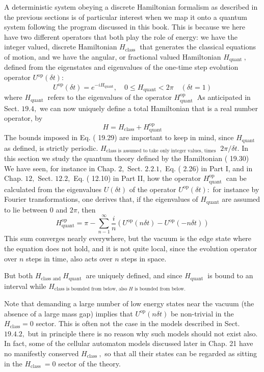 \documentclass[main.tex]{subfiles}
\begin{document}
A deterministic system obeying a discrete Hamiltonian formalism as described in the previous sections is of particular interest when we map it onto a quantum system following the program discussed in this book. This is because we here have two different operators that both play the role of energy: we have the integer valued, discrete Hamiltonian $H_{\text {class }}$ that generates the classical equations of motion, and we have the angular, or fractional valued Hamiltonian $H_{\text {quant }},$ defined from the eigenstates and eigenvalues of the one-time step evolution operator $U^{\mathrm{op}}(\delta t):$
$$
U^{\mathrm{op}}(\delta t)=e^{-i H_{\mathrm{quant}}}, \quad 0 \leq H_{\mathrm{quant}}<2 \pi \quad(\delta t=1)
$$
where $H_{\text {quant }}$ refers to the eigenvalues of the operator $H_{\text {quant }}^{\text {op }}$ As anticipated in Sect. $19.4,$ we can now uniquely define a total Hamiltonian that is a real number operator, by
$$
H=H_{\mathrm{class}}+H_{\mathrm{quant}}^{\mathrm{op}}
$$
The bounds imposed in Eq. ( 19.29) are important to keep in mind, since $H_{\mathrm{quant}}$ as defined, is strictly periodic. $H_{\text {class is assumed to take only integer values, times }}$ $2 \pi / \delta t .$ In this section we study the quantum theory defined by the Hamiltonian ( 19.30)
We have seen, for instance in Chap. $2,$ Sect. $2.2 .1,$ Eq. ( 2.26) in Part I, and in Chap. $12,$ Sect. $12.2,$ Eq. ( 12.10) in Part II, how the operator $H_{\text {quant }}^{\text {op }}$ can be calculated from the eigenvalues $U(\delta t)$ of the operator $U^{\mathrm{op}}(\delta t):$ for instance by Fourier transformations, one derives that, if the eigenvalues of $H_{\mathrm{quant}}$ are assumed to lie between 0 and $2 \pi$, then
$$
H_{\mathrm{quant}}^{\mathrm{op}}=\pi-\sum_{n-1}^{\infty} \frac{i}{n}\left(U^{\mathrm{op}}(n \delta t)-U^{\mathrm{op}}(-n \delta t)\right)
$$
This sum converges nearly everywhere, but the vacuum is the edge state where the equation does not hold, and it is not quite local, since the evolution operator over $n$ steps in time, also acts over $n$ steps in space.

But both $H_{\text {class and }} H_{\text {quant }}$ are uniquely defined, and since $H_{\text {quant }}$ is bound to an interval while $H_{\text {class is bounded from below, also } H \text { is bounded from below. }}$

Note that demanding a large number of low energy states near the vacuum (the absence of a large mass gap) implies that $U^{\mathrm{op}}(n \delta t)$ be non-trivial in the $H_{\mathrm{class}}=0$ sector. This is often not the case in the models described in Sect. $19.4 .2,$ but in principle there is no reason why such models should not exist also. In fact, some of the cellular automaton models discussed later in Chap. 21 have no manifestly conserved $H_{\text {class }},$ so that all their states can be regarded as sitting in the $H_{\text {class }}=0$ sector of the theory.
\end{document}
